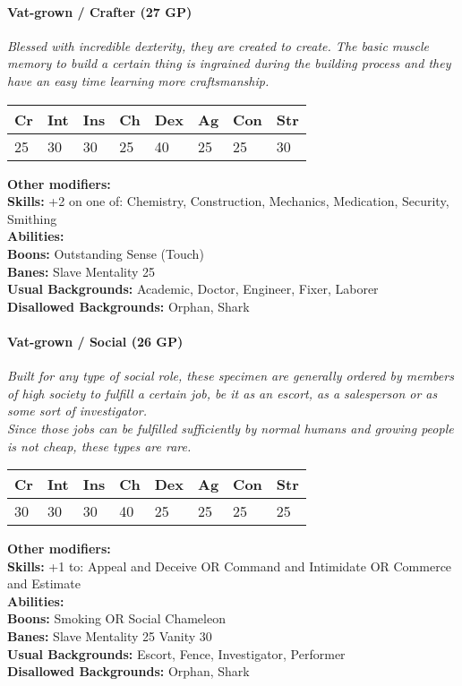 \documentclass[12pt,a4paper,openany]{book}
\begin{document}
	\hrulefill
	\paragraph*{Vat-grown / Crafter (27 GP)}
	\textit{Blessed with incredible dexterity, they are created to create. The basic muscle memory to build a certain thing is ingrained during the building process and they have an easy time learning more craftsmanship.}\par
	\begin{tabular}{|l|l|l|l|l|l|l|l|}
		\hline
		Cr & Int & Ins & Ch & Dex & Ag & Con & Str \\ \hline
		25 & 30 & 30 & 25 & 40 & 25 & 25 & 30 \\ \hline
	\end{tabular}\par
	\noindent\textbf{Other modifiers:} \\
	\textbf{Skills:} +2 on one of: Chemistry, Construction, Mechanics, Medication, Security, Smithing\\
	\textbf{Abilities:} \\
	\textbf{Boons:} Outstanding Sense (Touch)\\
	\textbf{Banes:} Slave Mentality 25\\
	\textbf{Usual Backgrounds:} Academic, Doctor, Engineer, Fixer, Laborer\\
	\textbf{Disallowed Backgrounds:} Orphan, Shark
	
	\hrulefill
	\paragraph*{Vat-grown / Social (26 GP)}
	\textit{Built for any type of social role, these specimen are generally ordered by members of high society to fulfill a certain job, be it as an escort, as a salesperson or as some sort of investigator.\\
	Since those jobs can be fulfilled sufficiently by normal humans and growing people is not cheap, these types are rare.}\par
	\begin{tabular}{|l|l|l|l|l|l|l|l|}
		\hline
		Cr & Int & Ins & Ch & Dex & Ag & Con & Str \\ \hline
		30 & 30 & 30 & 40 & 25 & 25 & 25 & 25 \\ \hline
	\end{tabular}\par
	\noindent\textbf{Other modifiers:} \\
	\textbf{Skills:} +1 to: Appeal and Deceive OR Command and Intimidate OR Commerce and Estimate\\
	\textbf{Abilities:} \\
	\textbf{Boons:} Smoking OR Social Chameleon\\
	\textbf{Banes:} Slave Mentality 25
	Vanity 30\\
	\textbf{Usual Backgrounds:} Escort, Fence, Investigator, Performer\\
	\textbf{Disallowed Backgrounds:} Orphan, Shark
	
\end{document}
